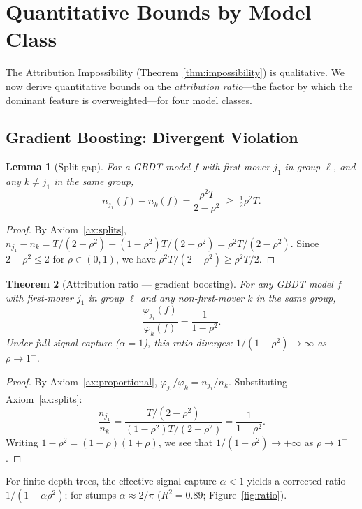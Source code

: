 \documentclass{article}
\newtheorem{theorem}{Theorem}
\newtheorem{lemma}[theorem]{Lemma}
\newcommand{\GBDT}{\textsc{GBDT}}
\begin{document}
\section{Quantitative Bounds by Model Class}
\label{sec:bounds}

The Attribution Impossibility (Theorem~\ref{thm:impossibility}) is qualitative. We now derive quantitative bounds on the \emph{attribution ratio}---the factor by which the dominant feature is overweighted---for four model classes.

\subsection{Gradient Boosting: Divergent Violation}
\label{sec:gbdt-bounds}

\begin{lemma}[Split gap]
\label{lem:split-gap}
For a \GBDT{} model $f$ with first-mover $j_1$ in group $\ell$, and any $k \neq j_1$ in the same group,
\[
    n_{j_1}(f) - n_k(f) = \frac{\rho^2 T}{2 - \rho^2} \;\geq\; \tfrac{1}{2}\rho^2 T.
\]
\end{lemma}

\begin{proof}
By Axiom~\ref{ax:splits}, $n_{j_1} - n_k = T/(2-\rho^2) - (1-\rho^2)T/(2-\rho^2) = \rho^2 T/(2-\rho^2)$.
Since $2 - \rho^2 \leq 2$ for $\rho \in (0,1)$, we have $\rho^2 T/(2-\rho^2) \geq \rho^2 T/2$.
\end{proof}

\begin{theorem}[Attribution ratio --- gradient boosting]
\label{thm:ratio}
For any \GBDT{} model $f$ with first-mover $j_1$ in group $\ell$ and any non-first-mover $k$ in the same group,
\[
    \frac{\varphi_{j_1}(f)}{\varphi_k(f)} = \frac{1}{1 - \rho^2}.
\]
Under full signal capture ($\alpha{=}1$), this ratio diverges: $1/(1-\rho^2) \to \infty$ as $\rho \to 1^-$.
\end{theorem}

\begin{proof}
By Axiom~\ref{ax:proportional}, $\varphi_{j_1}/\varphi_k = n_{j_1}/n_k$.
Substituting Axiom~\ref{ax:splits}:
\[
    \frac{n_{j_1}}{n_k} = \frac{T/(2-\rho^2)}{(1-\rho^2)T/(2-\rho^2)} = \frac{1}{1-\rho^2}.
\]
Writing $1-\rho^2 = (1-\rho)(1+\rho)$, we see that $1/(1-\rho^2) \to +\infty$ as $\rho \to 1^-$.
\end{proof}

For finite-depth trees, the effective signal capture $\alpha < 1$ yields a corrected ratio $1/(1{-}\alpha\rho^2)$; for stumps $\alpha \approx 2/\pi$ ($R^2{=}0.89$; Figure~\ref{fig:ratio}).
\end{document}
